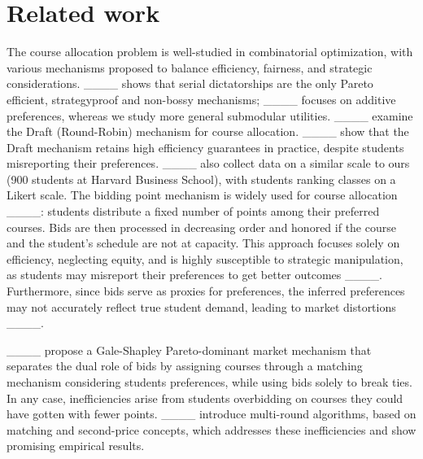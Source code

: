 \section{Related work}
The course allocation problem is well-studied in combinatorial optimization, with various mechanisms proposed to balance efficiency, fairness, and strategic considerations. 
____ shows that serial dictatorships are the only Pareto efficient, strategyproof and non-bossy mechanisms; ____ focuses on additive preferences, whereas we study more general submodular utilities. 
____ examine the Draft (Round-Robin) mechanism for course allocation. 
____ show that the Draft mechanism retains high efficiency guarantees in practice, despite students misreporting their preferences. ____ also collect data on a similar scale to ours (900 students at Harvard Business School), with students ranking classes on a Likert scale. 
The bidding point mechanism is widely used for course allocation ____: students distribute a fixed number of points among their preferred courses. 
Bids are then processed in decreasing order and honored if the course and the student's schedule are not at capacity. This approach focuses solely on efficiency, neglecting equity, and is highly susceptible to strategic manipulation, as students may misreport their preferences to get better outcomes ____. 
Furthermore, since bids serve as proxies for preferences, the inferred preferences may not accurately reflect true student demand, leading to market distortions ____. 

____ propose a Gale-Shapley Pareto-dominant market mechanism that separates the dual role of bids by assigning courses through a matching mechanism considering students preferences, while using bids solely to break ties. In any case, inefficiencies arise from students overbidding on courses they could have gotten with fewer points. 
____ introduce multi-round algorithms, based on matching and second-price concepts, which addresses these inefficiencies and show promising empirical results. 

